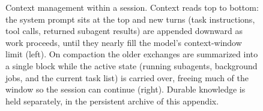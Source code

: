 \begin{figure}[htbp]
{\begin{tikzpicture}
        \end{tikzpicture}%
    }
    \caption{\label{fig:compaction}Context management within a session. Context reads top to bottom: the system prompt sits at the top and new turns (task instructions, tool calls, returned subagent results) are appended downward as work proceeds, until they nearly fill the model's context-window limit (left). On compaction the older exchanges are summarized into a single block while the active state (running subagents, background jobs, and the current task list) is carried over, freeing much of the window so the session can continue (right). Durable knowledge is held separately, in the persistent archive of this appendix.}
\end{figure}

